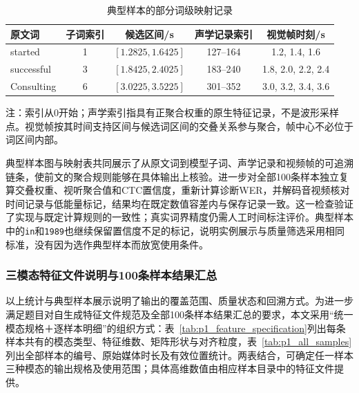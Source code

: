\begin{table}[H]
    \centering\small
    \caption{典型样本的部分词级映射记录}
    \label{tab:p1_mapping_records}
    \setlength{\tabcolsep}{6pt}
    \renewcommand{\arraystretch}{1.12}
    \ifdefined\pOneCompactTableBox\else\newsavebox{\pOneCompactTableBox}\fi
    \begin{lrbox}{\pOneCompactTableBox}
    \begin{tabular}{lcccc}
        \toprule
        原文词 & 子词索引 & 候选区间/s & 声学记录索引 & 视觉帧时刻/s\\
        \midrule
        started & 1 & $[1.2825,1.6425]$ & 127--164 & 1.2, 1.4, 1.6\\
        successful & 3 & $[1.8425,2.4025]$ & 183--240 & 1.8, 2.0, 2.2, 2.4\\
        Consulting & 6 & $[3.0225,3.5225]$ & 301--352 & 3.0, 3.2, 3.4, 3.6\\
        \bottomrule
    \end{tabular}
    \end{lrbox}
    \usebox{\pOneCompactTableBox}
\par\smallskip
\parbox{\wd\pOneCompactTableBox}{\footnotesize 注：索引从0开始；声学索引指具有正聚合权重的原生特征记录，不是波形采样点。视觉帧按其时间支持区间与候选词区间的交叠关系参与聚合，帧中心不必位于词区间内部。}
\end{table}

典型样本图与映射表共同展示了从原文词到模型子词、声学记录和视频帧的可追溯链条，使前文的聚合规则能够在具体输出上核验。进一步对全部100条样本独立复算交叠权重、视听聚合值和CTC置信度，重新计算诊断WER，并解码音视频核对时间记录与低能量标记，结果均在既定数值容差内与保存记录一致。这一检查验证了实现与既定计算规则的一致性；真实词界精度仍需人工时间标注评价。典型样本中的\texttt{in}和\texttt{1989}也继续保留置信度不足的标记，说明实例展示与质量筛选采用相同标准，没有因为选作典型样本而放宽使用条件。

\subsubsection{三模态特征文件说明与100条样本结果汇总}
\label{sec:p1_delivery}

以上统计与典型样本展示说明了输出的覆盖范围、质量状态和回溯方式。为进一步满足题目对自生成特征文件规范及全部100条样本结果汇总的要求，本文采用“统一模态规格＋逐样本明细”的组织方式：表~\ref{tab:p1_feature_specification}列出每条样本共有的模态类型、特征维数、矩阵形状与对齐粒度，表~\ref{tab:p1_all_samples}列出全部样本的编号、原始媒体时长及有效位置统计。两表结合，可确定任一样本三种模态的输出规格及使用范围；具体高维数值由相应样本目录中的特征文件提供。

